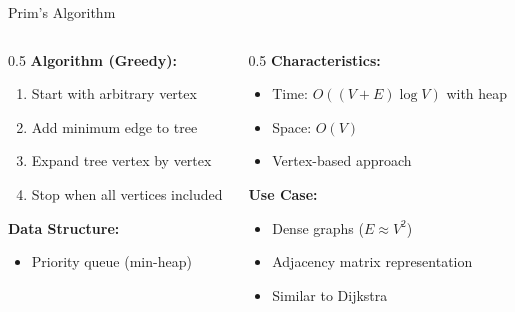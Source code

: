 \documentclass[aspectratio=169,xcolor=dvipsnames]{beamer}
\begin{document}
\begin{frame}{Prim's Algorithm}
  \begin{columns}
    \begin{column}{0.5\textwidth}
      \textbf{Algorithm (Greedy):}
      \begin{enumerate}
        \item Start with arbitrary vertex
        \item Add minimum edge to tree
        \item Expand tree vertex by vertex
        \item Stop when all vertices included
      \end{enumerate}

      \vspace{0.3cm}
      \textbf{Data Structure:}
      \begin{itemize}
        \item Priority queue (min-heap)
      \end{itemize}
    \end{column}

    \begin{column}{0.5\textwidth}
      \textbf{Characteristics:}
      \begin{itemize}
        \item Time: $O((V + E) \log V)$ with heap
        \item Space: $O(V)$
        \item Vertex-based approach
      \end{itemize}

      \vspace{0.3cm}
      \textbf{Use Case:}
      \begin{itemize}
        \item Dense graphs ($E \approx V^2$)
        \item Adjacency matrix representation
        \item Similar to Dijkstra
      \end{itemize}
    \end{column}
  \end{columns}
\end{frame}
\end{document}
